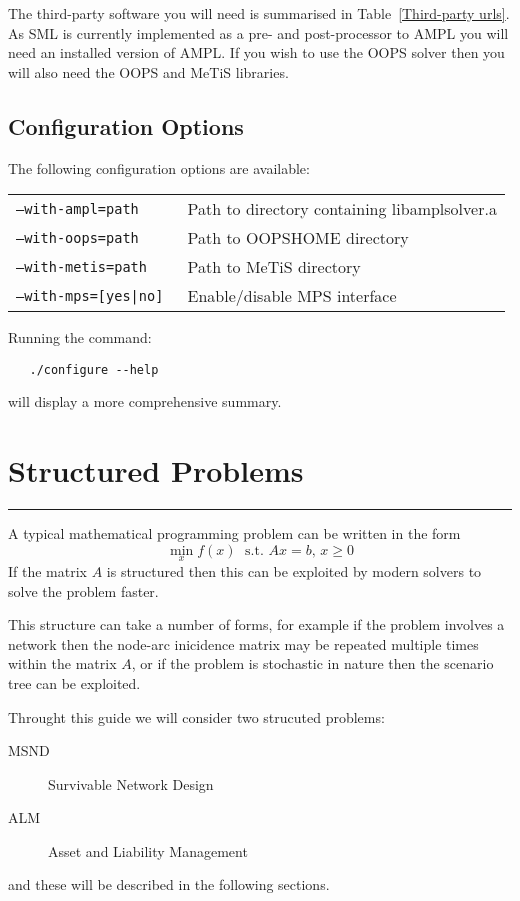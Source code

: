 \documentclass[10pt,a4paper]{book}
\begin{document}
The third-party software you will need is summarised in 
Table~\ref{Third-party urls}. As SML is currently implemented as a pre- and
post-processor to AMPL you will need an installed version of AMPL. If you wish
to use the OOPS solver then you will also need the OOPS and MeTiS libraries.

\section{Configuration Options}

The following configuration options are available:

\begin{tabular}{ll}
   \tt --with-ampl=path & Path to directory containing libamplsolver.a \\
   \tt --with-oops=path & Path to OOPSHOME directory \\
   \tt --with-metis=path & Path to MeTiS directory \\
   \tt --with-mps=[yes|no] & Enable/disable MPS interface
\end{tabular}

\noindent Running the command:
\begin{verbatim}
   ./configure --help
\end{verbatim}
will display a more comprehensive summary.

\chapter{Structured Problems}
\vspace{-0.6cm}\rule{\textwidth}{0.4ex}\vspace{0.1cm}
\label{background}

A typical mathematical programming problem can be written in the form
\begin{equation}
\min_x f(x)\; \text{~s.t.~} Ax=b,\, x\ge 0
\end{equation}
If the matrix $A$ is structured then this can be exploited by modern solvers
to solve the problem faster.

This structure can take a number of forms, for example if the problem involves
a network then the node-arc inicidence matrix may be repeated multiple times
within the matrix $A$, or if the problem is stochastic in nature then the
scenario tree can be exploited.

Throught this guide we will consider two strucuted problems:
\begin{description}
   \item[MSND] Survivable Network Design
   \item[ALM] Asset and Liability Management
\end{description}
and these will be described in the following sections.
\end{document}
